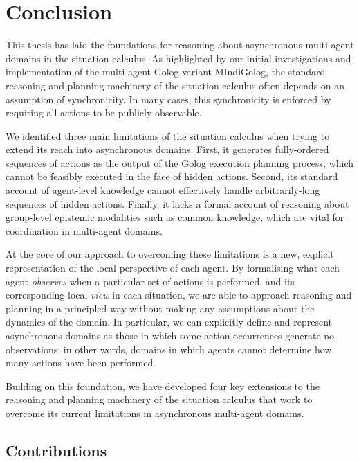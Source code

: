 

\chapter{Conclusion}

\label{ch:conclusion}

This thesis has laid the foundations for reasoning about asynchronous
multi-agent domains in the situation calculus. As highlighted by our
initial investigations and implementation of the multi-agent Golog
variant MIndiGolog, the standard reasoning and planning machinery
of the situation calculus often depends on an assumption of synchronicity.
In many cases, this synchronicity is enforced by requiring all actions
to be publicly observable.

We identified three main limitations of the situation calculus when
trying to extend its reach into asynchronous domains. First, it generates
fully-ordered sequences of actions as the output of the Golog execution
planning process, which cannot be feasibly executed in the face of
hidden actions. Second, its standard account of agent-level knowledge
cannot effectively handle arbitrarily-long sequences of hidden actions.
Finally, it lacks a formal account of reasoning about group-level
epistemic modalities such as common knowledge, which are vital for
coordination in multi-agent domains.

At the core of our approach to overcoming these limitations is a new,
explicit representation of the local perspective of each agent. By
formalising what each agent \emph{observes} when a particular set
of actions is performed, and its corresponding local \emph{view} in
each situation, we are able to approach reasoning and planning in
a principled way without making any assumptions about the dynamics
of the domain. In particular, we can explicitly define and represent
asynchronous domains as those in which some action occurrences generate
no observations; in other words, domains in which agents cannot determine
how many actions have been performed.

Building on this foundation, we have developed four key extensions
to the reasoning and planning machinery of the situation calculus
that work to overcome its current limitations in asynchronous multi-agent
domains.


\section{Contributions}

